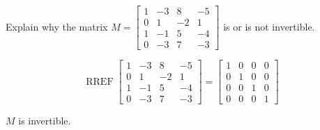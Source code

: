 
\begin{exerciseStatement}


Explain why the matrix \(M= \left[\begin{array}{cccc}
1 & -3 & 8 & -5 \\
0 & 1 & -2 & 1 \\
1 & -1 & 5 & -4 \\
0 & -3 & 7 & -3
\end{array}\right] \) is or is not invertible.


\end{exerciseStatement}
    
\begin{exerciseAnswer} 


\[\operatorname{RREF} \left[\begin{array}{cccc}
1 & -3 & 8 & -5 \\
0 & 1 & -2 & 1 \\
1 & -1 & 5 & -4 \\
0 & -3 & 7 & -3
\end{array}\right] = \left[\begin{array}{cccc}
1 & 0 & 0 & 0 \\
0 & 1 & 0 & 0 \\
0 & 0 & 1 & 0 \\
0 & 0 & 0 & 1
\end{array}\right] \]

\(M\) is invertible.
\end{exerciseAnswer}
    
